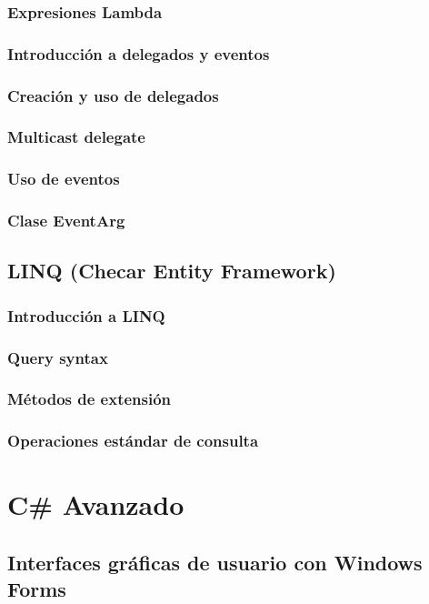 \documentclass[12pt,a4paper]{report}
\begin{document}
{\section{Expresiones Lambda}
\section{Introducción a delegados y eventos}
\section{Creación y uso de delegados}
\section{Multicast delegate}
\section{Uso de eventos}
\section{Clase EventArg}

\chapter{LINQ (Checar Entity Framework)}
\section{Introducción a LINQ}
\section{Query syntax}
\section{Métodos de extensión}
\section{Operaciones estándar de consulta}

\part{C\# Avanzado}
\chapter{ Interfaces gráficas de usuario con Windows Forms}
}
\end{document}

